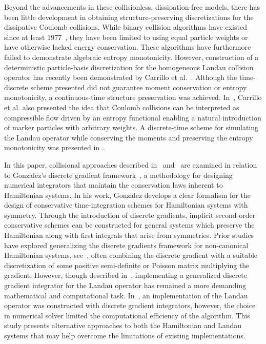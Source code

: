 \documentclass[preprint,12pt]{elsarticle}
\theoremstyle{definition}
\begin{document}
Beyond the advancements in these collisionless, dissipation-free models, there has been little development in obtaining structure-preserving discretizations for the dissipative Coulomb collisions. While binary collision algorithms have existed since at least 1977~\cite{Itoh1988, Nanbu1997}, they have been limited to using equal particle weights or have otherwise lacked energy conservation. These algorithms have furthermore failed to demonstrate algebraic entropy monotonicity. However, construction of a deterministic particle-basis discretization for the homogeneous Landau collision operator has recently been demonstrated by Carrillo et al.~\cite{Carrillo2020}. Although the time-discrete scheme presented did not guarantee moment conservation or entropy monotonicity, a continuous-time structure preservation was achieved. In~\cite{Carrillo2020}, Carrillo et al. also presented the idea that Coulomb collisions can be interpreted as compressible flow driven by an entropy functional enabling a natural introduction of marker particles with arbitrary weights. A discrete-time scheme for simulating the Landau operator while conserving the moments and preserving the entropy monotonicity was presented in~\cite{Hirvijoki2020}. 

In this paper, collisional approaches described in~\cite{Carrillo2020} and~\cite{Hirvijoki2020} are examined in relation to Gonzalez’s discrete gradient framework~\cite{Gonzalez1996}, a methodology for designing numerical integrators that maintain the conservation laws inherent to Hamiltonian systems.
In his work, Gonzalez develops a clear formalism for the design of conservative time-integration schemes for Hamiltonian systems with symmetry. Through the introduction of discrete gradients, implicit second-order conservative schemes can be constructed for general systems which preserve the Hamiltonian along with first integrals that arise from symmetries. Prior studies have explored generalizing the discrete gradients framework for non-canonical Hamiltonian systems, see~\cite{Cohen2011}, often combining the discrete gradient with a suitable discretization of some positive semi-definite or Poisson matrix multiplying the gradient. However, though described in~\cite{Kraus2017,Hirvijoki2018,Eero2020}, implementing a generalized discrete gradient integrator for the Landau operator has remained a more demanding mathematical and computational task. In~\cite{Hu2024}, an implementation of the Landau operator was constructed with discrete gradient integrators, however, the choice in numerical solver limited the computational efficiency of the algorithm. This study presents alternative approaches to both the Hamiltonian and Landau systems that may help overcome the limitations of existing implementations.
\end{document}
